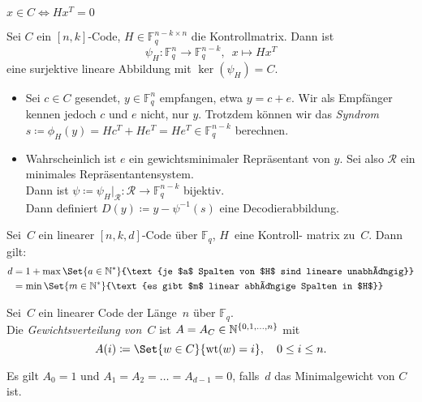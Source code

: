 \documentclass{cheat-sheet}
\newcommand{\F}{\mathbb{F}} %
\DeclareMathOperator{\wt}{wt} %
\begin{document}
\begin{lem}
  $x \in C \iff H x^T = 0$
\end{lem}

\begin{alg}
  Sei $C$ ein $[n,k]$-Code, $H \in \F_q^{n-k \times n}$ die Kontrollmatrix.
  Dann ist
  \[ \psi_H : \F_q^n \to \F_q^{n-k}, \enspace x \mapsto H x^T \]
  eine surjektive lineare Abbildung mit $\ker(\psi_H) = C$.
  \begin{itemize}
    \item Sei $c \in C$ gesendet, $y \in \F_q^n$ empfangen, etwa $y = c + e$.
    Wir als Empfänger kennen jedoch $c$ und $e$ nicht, nur $y$.
    Trotzdem können wir das \emph{Syndrom} $s \coloneqq \phi_H(y) = H c^T + H e^T = H e^T \in \F_q^{n-k}$ berechnen.
    \item Wahrscheinlich ist $e$ ein gewichtsminimaler Repräsentant von $y$.
    Sei also $\mathcal{R}$ ein minimales Repräsentantensystem. \\
    Dann ist $\psi \coloneqq \psi_H|_{\mathcal{R}} : \mathcal{R} \to \F_q^{n-k}$ bijektiv. \\
    Dann definiert $D(y) \coloneqq y - \psi^{-1}(s)$ eine Decodierabbildung.
  \end{itemize}
\end{alg}


\begin{satz}
  Sei~$C$ ein linearer $[n, k, d]$-Code über $\F_q$, $H$~eine Kontroll- matrix zu~$C$.
  Dann gilt:
  \begin{align*}
    d &= 1 + \max \Set{a \in \N^*}{\text{je $a$ Spalten von $H$ sind lineare unabhängig}} \\
    &= \min \Set{m \in \N^*}{\text{es gibt $m$ linear abhängige Spalten in $H$}}
  \end{align*}
\end{satz}

\begin{defn}
  Sei~$C$ ein linearer Code der Länge~$n$ über $\F_q$. \\
  Die \emph{Gewichtsverteilung von~$C$} ist
  $A = A_C \in \mathbb{N}^{\{ 0, 1, \ldots, n \}}$ mit
  \[
    A(i) \coloneqq \Set{w \in C}{\wt(w) = i}, \quad
    0 \leq i \leq n.
  \]
\end{defn}

\begin{bem}
  Es gilt $A_0 = 1$ und $A_1 = A_2 = \ldots = A_{d-1} = 0$, falls~$d$ das Minimalgewicht von $C$ ist.
\end{bem}
\end{document}
